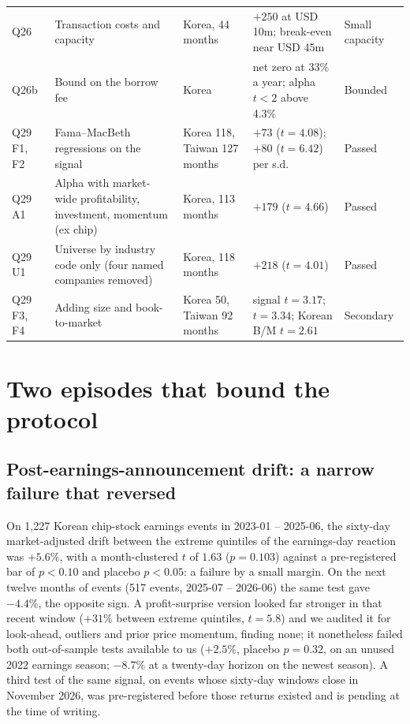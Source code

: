 \documentclass[12pt,a4paper]{article}
\begin{document}
\begin{longtable}{@{}L{1.3cm} L{4.4cm} L{2.6cm} L{4.6cm} L{2.0cm}@{}}
Q26 & Transaction costs and capacity & Korea, 44 months & $+250$ at USD 10m; break-even near USD 45m & Small capacity \\
Q26b & Bound on the borrow fee & Korea & net zero at 33\% a year; alpha $t<2$ above 4.3\% & Bounded \\
Q29 F1, F2 & Fama--MacBeth regressions on the signal & Korea 118, Taiwan 127 months & $+73$ ($t=4.08$); $+80$ ($t=6.42$) per s.d. & Passed \\
Q29 A1 & Alpha with market-wide profitability, investment, momentum (ex chip) & Korea, 113 months & $+179$ ($t=4.66$) & Passed \\
Q29 U1 & Universe by industry code only (four named companies removed) & Korea, 118 months & $+218$ ($t=4.01$) & Passed \\
Q29 F3, F4 & Adding size and book-to-market & Korea 50, Taiwan 92 months & signal $t=3.17$; $t=3.34$; Korean B/M $t=2.61$ & Secondary \\
\end{longtable}
\endgroup

\section{Two episodes that bound the protocol}

\subsection{Post-earnings-announcement drift: a narrow failure that reversed}
 On 1{,}227 Korean chip-stock earnings
events in 2023-01 -- 2025-06, the sixty-day market-adjusted drift between the extreme quintiles of the earnings-day
reaction was $+5.6\%$, with a month-clustered $t$ of $1.63$ ($p=0.103$) against a pre-registered bar of $p<0.10$ and
placebo $p<0.05$: a failure by a small margin. On the next twelve months of events (517 events, 2025-07 -- 2026-06) the
same test gave $\mathbf{-4.4\%}$, the opposite sign. A profit-surprise version looked far stronger in that recent window
($+31\%$ between extreme quintiles, $t=5.8$) and we audited it for look-ahead, outliers and prior price momentum,
finding none; it nonetheless failed both out-of-sample tests available to us ($+2.5\%$, placebo $p=0.32$, on an unused
2022 earnings season; $-8.7\%$ at a twenty-day horizon on the newest season). A third test of the same signal, on events
whose sixty-day windows close in November 2026, was pre-registered before those returns existed and is pending at the
time of writing.
\end{document}
